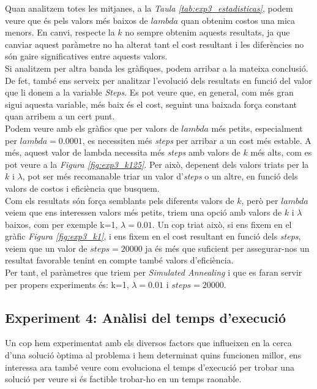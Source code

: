 \documentclass[a4paper]{article}
\begin{document}
	Quan analitzem totes les mitjanes, a la \textit{Taula \ref{tab:exp3_estadisticas}}, podem veure que és pels valors més baixos de $lambda$ quan obtenim costos una mica menors. En canvi, respecte la $k$ no sempre obtenim aquests resultats, ja que canviar aquest paràmetre no ha alterat tant el cost resultant i les diferències no són gaire significatives entre aquests valors. \\

	Si analitzem per altra banda les gràfiques, podem arribar a la mateixa conclusió. De fet, també ens serveix per analitzar l'evolució dels resultats en funció del valor que li donem a la variable \textit{Steps}. Es pot veure que, en general, com més gran sigui aquesta variable, més baix és el cost, seguint una baixada força constant quan arribem a un cert punt. \\
	
	Podem veure amb els gràfics que per valors de $lambda$ més petits, especialment per $lambda=0.0001$, es necessiten més \textit{steps} per arribar a un cost més estable. A més, aquest valor de lambda necessita més \textit{steps} amb valors de $k$ més alts, com es pot veure a la \textit{Figura \ref{fig:exp3_k125}}. Per això, depenent dels valors triats per la $k$ i $\lambda$, pot ser més recomanable triar un valor d'\textit{steps} o un altre, en funció dels valors de costos i eficiència que busquem. \\

	Com els resultats són força semblants pels diferents valors de $k$, però per $lambda$ veiem que ens interessen valors més petits, triem una opció amb valors de $k$ i $\lambda$ baixos, com per exemple k=1, $\lambda=0.01$. Un cop triat això, si ens fixem en el gràfic \textit{Figura \ref{fig:exp3_k1}}, i ens fixem en el cost resultant en funció dels \textit{steps}, veiem que un valor de $steps=20000$ ja és més que suficient per assegurar-nos un resultat favorable tenint en compte també valors d'eficiència. \\
		
	Per tant, el paràmetres que triem per \textit{Simulated Annealing} i que es faran servir per propers experiments és: k=1, $\lambda = 0.01$ i $steps = 20000$.
	

	\subsection{Experiment 4: Anàlisi del temps d'execució}
	\label{sec:exp4}

	Un cop hem experimentat amb els diversos factors que influeixen en la cerca d'una solució òptima al problema i hem determinat quins funcionen millor, ens interessa ara també veure com evoluciona el temps d'execució per trobar una solució per veure si és factible trobar-ho en un temps raonable.\\
\end{document}
